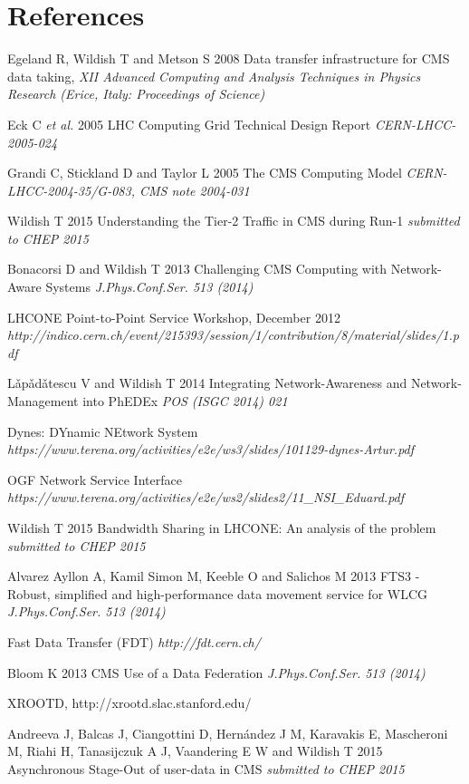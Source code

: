 \section*{References}

\begin{thebibliography}{1}

  Egeland R, Wildish T and Metson S 2008 Data transfer infrastructure for CMS data taking,  {\it XII Advanced Computing and Analysis Techniques in Physics Research (Erice, Italy: Proceedings of Science)}

 Eck C {\it et al.} 2005 LHC Computing Grid Technical Design Report {\it CERN-LHCC-2005-024}

  Grandi C, Stickland D and Taylor L 2005 The CMS Computing Model {\it CERN-LHCC-2004-35/G-083, CMS note 2004-031}

 Wildish T 2015 Understanding the Tier-2 Traffic in CMS during Run-1 {\it submitted to CHEP 2015}

 Bonacorsi D and Wildish T 2013 Challenging CMS Computing with Network-Aware Systems {\it J.Phys.Conf.Ser. 513 (2014)}

 LHCONE Point-to-Point Service Workshop, December 2012 
 {\it http://indico.cern.ch/event/215393/session/1/contribution/8/material/slides/1.pdf}

 L\v{a}p\v{a}d\v{a}tescu V and Wildish T 2014 Integrating Network-Awareness and Network-Management into PhEDEx {\it POS (ISGC 2014) 021}

 Dynes: DYnamic NEtwork System {\it https://www.terena.org/activities/e2e/ws3/slides/101129-dynes-Artur.pdf}


 OGF Network Service Interface {\it https://www.terena.org/activities/e2e/ws2/slides2/11\_NSI\_Eduard.pdf}

 Wildish T 2015 Bandwidth Sharing in LHCONE: An analysis of the problem {\it submitted to CHEP 2015}

 Alvarez Ayllon A, Kamil Simon M, Keeble O and Salichos M 2013 FTS3 - Robust, simplified and high-performance data movement service for WLCG {\it J.Phys.Conf.Ser. 513 (2014)}

 Fast Data Transfer (FDT) {\it http://fdt.cern.ch/}

 Bloom K 2013 CMS Use of a Data Federation {\it J.Phys.Conf.Ser. 513 (2014)}

 XROOTD, http://xrootd.slac.stanford.edu/

 Andreeva J, Balcas J, Ciangottini D, Hernández J M, Karavakis E, Mascheroni M, Riahi H, Tanasijczuk A J, Vaandering E W and Wildish T 2015 Asynchronous Stage-Out of user-data in CMS {\it submitted to CHEP 2015}

\end{thebibliography}